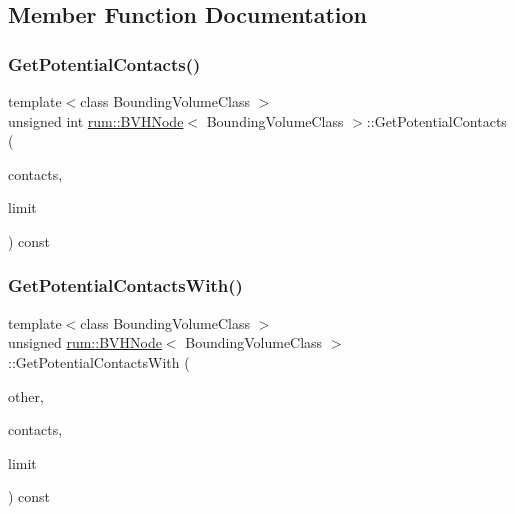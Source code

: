 \subsection{Member Function Documentation}
\mbox{\label{classrum_1_1_b_v_h_node_a951e91e4c58802cb843e5b0a146c4eb1}} 
\subsubsection{\texorpdfstring{Get\+Potential\+Contacts()}{GetPotentialContacts()}}
{\footnotesize\ttfamily template$<$class Bounding\+Volume\+Class $>$ \\
unsigned int \hyperlink{classrum_1_1_b_v_h_node}{rum\+::\+B\+V\+H\+Node}$<$ Bounding\+Volume\+Class $>$\+::Get\+Potential\+Contacts (\begin{DoxyParamCaption}\item[{\hyperlink{structrum_1_1_potential_contacts}{Potential\+Contacts} $\ast$}]{contacts,  }\item[{unsigned int}]{limit }\end{DoxyParamCaption}) const}

\mbox{\label{classrum_1_1_b_v_h_node_a51c82ced5651f99e338bd0ce71700ca6}} 
\subsubsection{\texorpdfstring{Get\+Potential\+Contacts\+With()}{GetPotentialContactsWith()}}
{\footnotesize\ttfamily template$<$class Bounding\+Volume\+Class $>$ \\
unsigned \hyperlink{classrum_1_1_b_v_h_node}{rum\+::\+B\+V\+H\+Node}$<$ Bounding\+Volume\+Class $>$\+::Get\+Potential\+Contacts\+With (\begin{DoxyParamCaption}\item[{\hyperlink{classrum_1_1_b_v_h_node}{B\+V\+H\+Node}$<$ Bounding\+Volume\+Class $>$ $\ast$}]{other,  }\item[{\hyperlink{structrum_1_1_potential_contacts}{Potential\+Contacts} $\ast$}]{contacts,  }\item[{unsigned}]{limit }\end{DoxyParamCaption}) const\hspace{0.3cm}{\ttfamily [protected]}}

